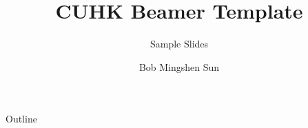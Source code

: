 

\title[Sample]{CUHK Beamer Template}
\subtitle{Sample Slides}
\author[Bob]{Bob Mingshen Sun}



\frame[plain]{\maketitle}

\begin{frame}{Outline}
  \tableofcontents{}
\end{frame}

\begin{frame}{}
  
\end{frame}


